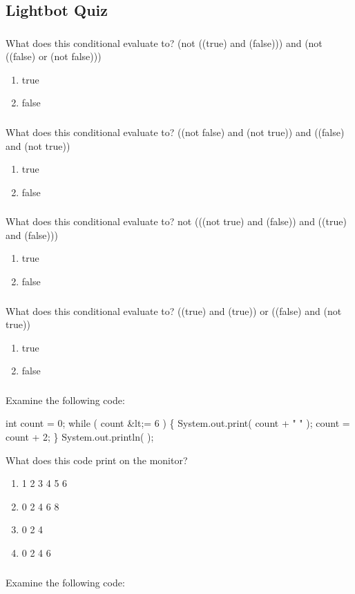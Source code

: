 \subsection{Lightbot Quiz} \subsubsection{} What does this conditional evaluate to? 
 (not ((true) and (false))) and (not ((false) or (not false))) \begin{enumerate}  \item true \item false \end{enumerate}  \subsubsection{} What does this conditional evaluate to? 
 ((not false) and (not true)) and ((false) and (not true)) \begin{enumerate}  \item true \item false \end{enumerate}  \subsubsection{} What does this conditional evaluate to? 
 not (((not true) and (false)) and ((true) and (false))) \begin{enumerate}  \item true \item false \end{enumerate}  \subsubsection{} What does this conditional evaluate to? 
 ((true) and (true)) or ((false) and (not true)) \begin{enumerate}  \item true \item false \end{enumerate}  \subsubsection{} Examine the following code: 

 int count = 0; 
 while ( count \&lt;= 6 ) 
 \{ 
 System.out.print( count + " " ); 
 count = count + 2; 
\} 
 System.out.println(  ); 

 What does this code print on the monitor? \begin{enumerate}  \item 1 2 3 4 5 6 \item 0 2 4 6 8 \item 0 2 4 \item 0 2 4 6 \end{enumerate}  \subsubsection{} Examine the following code: 

